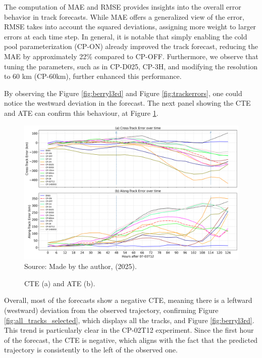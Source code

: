The computation of MAE and RMSE provides insights into the overall error behavior in track forecasts. While MAE offers a generalized view of the error, RMSE takes into account the squared deviations, assigning more weight to larger errors at each time step. In general, it is notable that simply enabling the cold pool parameterization (CP-ON) already improved the track forecast, reducing the MAE by approximately 22\% compared to CP-OFF. Furthermore, we observe that tuning the parameters, such as in CP-D025, CP-3H, and modifying the resolution to 60 km (CP-60km), further enhanced this performance.

By observing the Figure \ref{fig:berryl3rd} and Figure \ref{fig:trackerrors}, one could notice the westward deviation in the forecast. The next panel showing the CTE and ATE can confirm this behaviour, at Figure \ref{fig:cte}.

\begin{figure}[!ht]
	\centering
	\caption{CTE (a) and ATE (b).} %
	\includegraphics[width=\textwidth]{docs/figuras/chapter5/Cross_Track_Along_Track_Errors_FINAL.png} 
	\vspace{0.5em}
	Source: Made by the author, (2025).  %
	\label{fig:cte} %
\end{figure}

Overall, most of the forecasts show a negative CTE, meaning there is a leftward (westward) deviation from the observed trajectory, confirming Figure \ref{fig:all_tracks_selected}, which displays all the tracks, and Figure \ref{fig:berryl3rd}. This trend is particularly clear in the CP-02T12 experiment. Since the first hour of the forecast, the CTE is negative, which aligns with the fact that the predicted trajectory is consistently to the left of the observed one.

